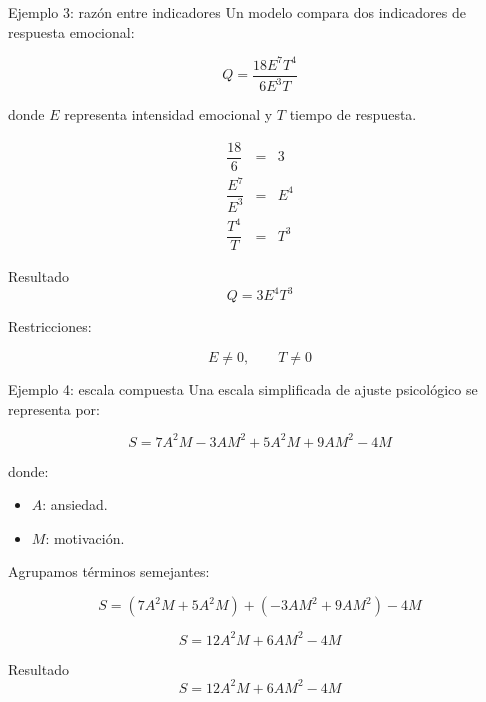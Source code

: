 \documentclass[handout,aspectratio=169]{beamer}
\begin{document}
	\begin{frame}{Ejemplo 3: razón entre indicadores}
		Un modelo compara dos indicadores de respuesta emocional:
		
		\[
		Q=\frac{18E^7T^4}{6E^3T}
		\]
		
		donde \(E\) representa intensidad emocional y \(T\) tiempo de respuesta.
		
		\pause
		
		\[
		\begin{array}{rcl}
			\dfrac{18}{6} & = & 3 \\[0.3cm]
			\dfrac{E^7}{E^3} & = & E^4 \\[0.3cm]
			\dfrac{T^4}{T} & = & T^3
		\end{array}
		\]
		
		\pause
		
		\begin{block}{Resultado}
			\[
			Q=3E^4T^3
			\]
		\end{block}
		
		\pause
		
		\begin{alerta}
			Restricciones:
			
			\[
			E\neq0,\qquad T\neq0
			\]
		\end{alerta}
	\end{frame}
	
	
	\begin{frame}{Ejemplo 4: escala compuesta}
		Una escala simplificada de ajuste psicológico se representa por:
		
		\[
		S=7A^2M-3AM^2+5A^2M+9AM^2-4M
		\]
		
		donde:
		
		\begin{itemize}
			\item \(A\): ansiedad.
			\item \(M\): motivación.
		\end{itemize}
		
		\pause
		
		Agrupamos términos semejantes:
		
		\[
		S=(7A^2M+5A^2M)+(-3AM^2+9AM^2)-4M
		\]
		
		\pause
		
		\[
		S=12A^2M+6AM^2-4M
		\]
		
		\pause
		
		\begin{block}{Resultado}
			\[
			S=12A^2M+6AM^2-4M
			\]
		\end{block}
	\end{frame}
	
\end{document}
